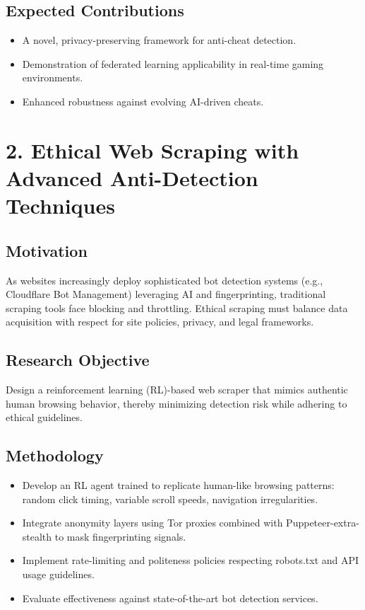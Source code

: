 \documentclass[11pt]{article}
\begin{document}
\subsection{Expected Contributions}
\label{sec:org5cdcb91}
\begin{itemize}
\item A novel, privacy-preserving framework for anti-cheat detection.
\item Demonstration of federated learning applicability in real-time gaming environments.
\item Enhanced robustness against evolving AI-driven cheats.
\end{itemize}
\section{2. Ethical Web Scraping with Advanced Anti-Detection Techniques}
\label{sec:org778612f}
\subsection{Motivation}
\label{sec:org9ddf2a9}
As websites increasingly deploy sophisticated bot detection systems (e.g., Cloudflare Bot Management) leveraging AI and fingerprinting, traditional scraping tools face blocking and throttling. Ethical scraping must balance data acquisition with respect for site policies, privacy, and legal frameworks.
\subsection{Research Objective}
\label{sec:orgdf03103}
Design a reinforcement learning (RL)-based web scraper that mimics authentic human browsing behavior, thereby minimizing detection risk while adhering to ethical guidelines.
\subsection{Methodology}
\label{sec:orga1e9d16}
\begin{itemize}
\item Develop an RL agent trained to replicate human-like browsing patterns: random click timing, variable scroll speeds, navigation irregularities.
\item Integrate anonymity layers using Tor proxies combined with Puppeteer-extra-stealth to mask fingerprinting signals.
\item Implement rate-limiting and politeness policies respecting robots.txt and API usage guidelines.
\item Evaluate effectiveness against state-of-the-art bot detection services.
\end{itemize}
\end{document}
